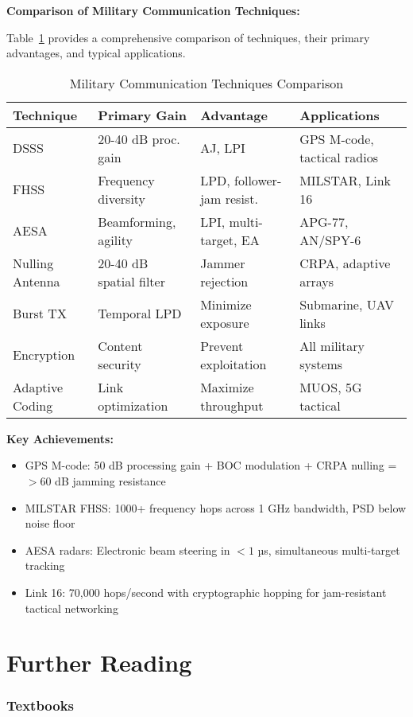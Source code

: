 \textbf{Comparison of Military Communication Techniques:}

Table~\ref{tab:military-techniques} provides a comprehensive comparison of techniques, their primary advantages, and typical applications.

\begin{table}[h]
\centering
\caption{Military Communication Techniques Comparison}
\label{tab:military-techniques}
\begin{tabular}{llll}
\toprule
\textbf{Technique} & \textbf{Primary Gain} & \textbf{Advantage} & \textbf{Applications} \\
\midrule
DSSS & 20-40 dB proc. gain & AJ, LPI & GPS M-code, tactical radios \\
FHSS & Frequency diversity & LPD, follower-jam resist. & MILSTAR, Link 16 \\
AESA & Beamforming, agility & LPI, multi-target, EA & APG-77, AN/SPY-6 \\
Nulling Antenna & 20-40 dB spatial filter & Jammer rejection & CRPA, adaptive arrays \\
Burst TX & Temporal LPD & Minimize exposure & Submarine, UAV links \\
Encryption & Content security & Prevent exploitation & All military systems \\
Adaptive Coding & Link optimization & Maximize throughput & MUOS, 5G tactical \\
\bottomrule
\end{tabular}
\end{table}

\textbf{Key Achievements:}
\begin{itemize}
\item GPS M-code: 50 dB processing gain + BOC modulation + CRPA nulling = $>60$ dB jamming resistance
\item MILSTAR FHSS: 1000+ frequency hops across 1 GHz bandwidth, PSD below noise floor
\item AESA radars: Electronic beam steering in $<1$ µs, simultaneous multi-target tracking
\item Link 16: 70,000 hops/second with cryptographic hopping for jam-resistant tactical networking
\end{itemize}

\section{Further Reading}

\subsubsection{Textbooks}\label{textbooks}

